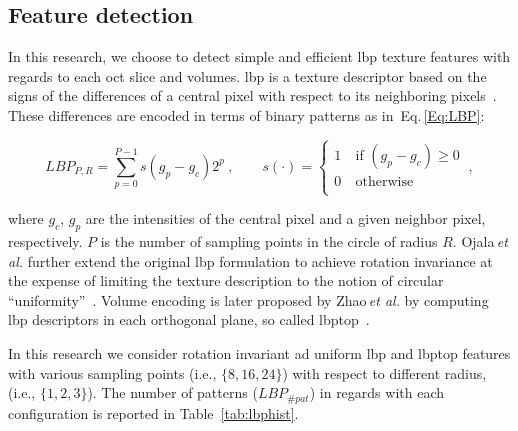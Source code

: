 
\subsection{Feature detection}\label{subsec:feaext}
In this research, we choose to detect simple and efficient \ac{lbp} texture features with regards to each \ac{oct} slice and volumes.
\ac{lbp} is a texture descriptor based on the signs of the differences of a central pixel with respect to its neighboring pixels~\cite{ojala2002multiresolution}.
These differences are encoded in terms of binary patterns as in~Eq.\,\eqref{Eq:LBP}:

\begin{equation}\label{Eq:LBP}
LBP_{P,R} = \sum_{p=0}^{P-1}s(g_{p} - g_{c})2^{p} \ , \qquad s(\cdot) = \begin{cases}
    1  & \ \text{if } (g_{p} - g_{c}) \geq 0\\
    0  & \ \text{otherwise}\\
  \end{cases} \ ,
\end{equation}

\noindent where $g_c$, $g_{p}$ are the intensities of the central pixel and a given neighbor pixel, respectively. $P$ is the number of sampling points in the circle of radius $R$.
Ojala\,\textit{et al.} further extend the original \ac{lbp} formulation to achieve rotation invariance at the expense of limiting the texture description to the notion of circular ``uniformity''~\cite{ojala2002multiresolution}.
Volume encoding is later proposed by Zhao\,\textit{et al.} by computing \ac{lbp} descriptors in each orthogonal plane, so called \ac{lbptop}~\cite{zhao2012rotation}.

In this research we consider rotation invariant ad uniform \ac{lbp} and \ac{lbptop} features with various sampling points (i.e., $\{8,16,24\}$) with respect to different radius, (i.e., $\{1,2,3\}$).
The number of patterns ($LBP_{\#pat}$) in regards with each configuration is reported in Table~\ref{tab:lbphist}.

